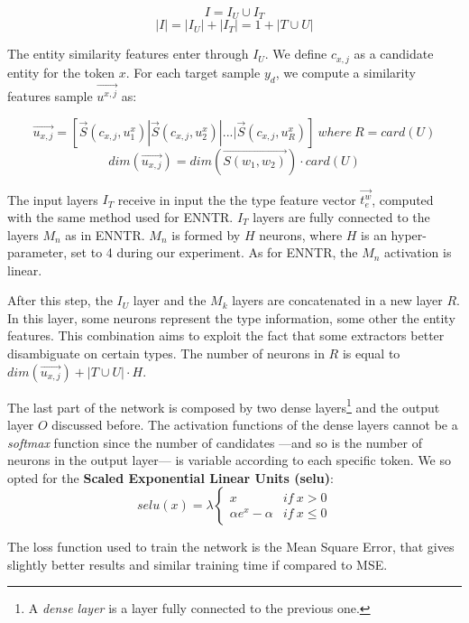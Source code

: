 \documentclass{llncs}
\begin{document}
$$I = I_U \cup I_T$$
$$\left\vert{I}\right\vert= \left\vert{I_U}\right\vert + \left\vert{I_T}\right\vert = 1 + \left\vert{T \cup U}\right\vert$$

The entity similarity features enter through $I_U$. We define $c_{x,j}$  as a candidate entity for the token $x$. For each target sample $y_d$, we compute a similarity features sample $\vec{u^{x,j}}$ as:

$$\vec{u_{x,j}} = [\vec{S}(c_{x,j},u^{x}_{1})|\vec{S}(c_{x,j},u^{x}_{2})|...|\vec{S}(c_{x,j},u^{x}_{R})] \: where \: R = card(U)$$
$$dim(\vec{u_{x,j}}) = dim(\vec{S(w_1,w_2)}) \cdot  card(U) $$

The input layers $I_T$ receive in input the the type feature vector $\vec{t^{w}_{e}}$, computed with the same method used for ENNTR. $I_T$ layers are fully connected to the layers $M_n$ as in ENNTR. $M_n$ is formed by $H$ neurons, where $H$ is an hyper-parameter, set to 4 during our experiment. As for ENNTR, the $M_n$ activation is linear.
 
After this step, the $I_U$ layer and the $M_k$ layers are concatenated in a new layer $R$. In this layer, some neurons represent the type information, some other the entity features. This combination aims to exploit the fact that some extractors better disambiguate on certain types. The number of neurons in $R$ is equal to $dim(\vec{u_{x,j}}) + \left\vert{T \cup U}\right\vert \cdot H$.

The last part of the network is composed by two dense layers\footnote{A \textit{dense layer} is a layer fully connected to the previous one.} and the output layer $O$ discussed before. The activation functions of the dense layers cannot be a \textit{softmax} function since the number of candidates ---and so is the number of neurons in the output layer--- is variable according to each specific token. We so opted for the \textbf{Scaled Exponential Linear Units (selu)}:
$$selu(x) = \lambda \left\{\begin{matrix} 
x & if \: x > 0\\
\alpha e^{x} - \alpha & if \: x \leq 0 
\end{matrix}\right.$$

The loss function used to train the network is the Mean Square Error, that gives slightly better results and similar training time if compared to MSE.
\end{document}
